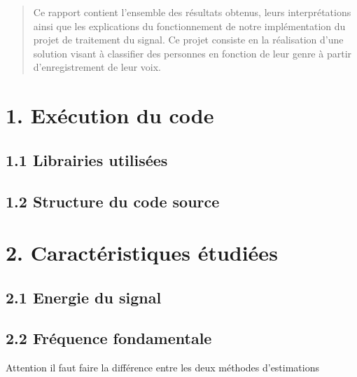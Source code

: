 \documentclass[a4paper,12pt]{report}	%
\begin{document}
\umonsCoverPage		%
	

\begin{abstract}
Ce rapport contient l'ensemble des résultats obtenus, leurs interprétations ainsi que les explications du fonctionnement de notre implémentation du projet de traitement du signal. Ce projet consiste en la réalisation d'une solution visant à classifier des personnes en fonction de leur genre à partir d'enregistrement de leur voix.
\end{abstract}

\clearpage		
\tableofcontents

\clearpage		
{}

{\section*{1. Exécution du code}}
{\subsection*{1.1 Librairies utilisées}}
{\subsection*{1.2 Structure du code source}}

{\section*{2. Caractéristiques étudiées}}



{\subsection*{2.1 Energie du signal}}

{\subsection*{2.2 Fréquence fondamentale}}
Attention il faut faire la différence entre les deux méthodes d'estimations
\end{document}
